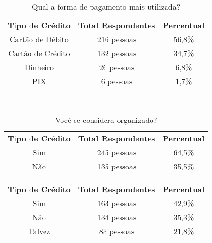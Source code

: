 \begin{apendicesenv}
\begin{table}[ht]
    \begin{center}
        \begin{minipage}{\textwidth}
            \centering
            \begin{tabular}{|c|c|c|}
                \textbf{Tipo de Crédito} & \textbf{Total Respondentes} & \textbf{Percentual} \\
                Cartão de Débito & 216 pessoas & 56,8\% \\
                Cartão de Crédito & 132 pessoas & 34,7\% \\
                Dinheiro & 26 pessoas & 6,8\% \\
                PIX & 6 pessoas & 1,7\% \\
            \end{tabular}
        \end{minipage}
    \end{center}
    
    \caption{Qual a forma de pagamento mais utilizada?}
    \label{tab:pagto}
\end{table}
\
\begin{table}[ht]
    \centering
    \setlength{\extrarowheight}{3pt}  %

    \begin{center}
        \begin{minipage}{\textwidth}
            \centering
            \begin{tabular}{|c|c|c|}
                \textbf{Tipo de Crédito} & \textbf{Total Respondentes} & \textbf{Percentual} \\
                Sim & 245 pessoas & 64,5\% \\
                Não & 135 pessoas & 35,5\% \\
            \end{tabular}
        \end{minipage}
    \end{center}
    
    \caption{Você se considera organizado?}
    \label{tab:consorg}
\end{table}

\begin{table}[ht]
    \centering
    \setlength{\extrarowheight}{3pt}  %

    \begin{center}
        \begin{minipage}{\textwidth}
            \centering
            \begin{tabular}{|c|c|c|}
                \textbf{Tipo de Crédito} & \textbf{Total Respondentes} & \textbf{Percentual} \\
                Sim & 163 pessoas & 42,9\% \\
                Não & 134 pessoas & 35,3\% \\
                Talvez & 83 pessoas & 21,8\% \\
            \end{tabular}
        \end{minipage}
    \end{center}
    

\end{table}
\end{apendicesenv}
